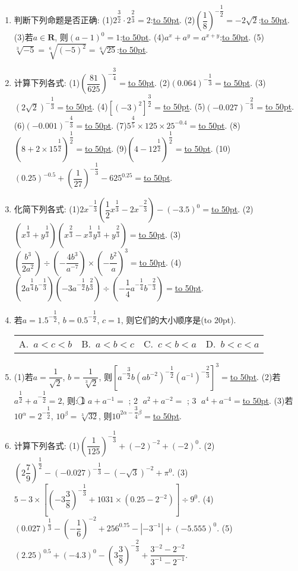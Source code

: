 \documentclass[10pt,a4paper]{article}
\newcommand{\blank}[1]{\underline{\hbox to #1pt{}}}
\newcommand{\bracket}[1]{(\hbox to #1pt{})}
\newcommand{\fourch}[4]{\par\begin{tabular}{p{.23\textwidth}p{.23\textwidth}p{.23\textwidth}p{.23\textwidth}}
A.~#1 &B.~#2& C.~#3& D.~#4
\end{tabular}}
\begin{document}
\begin{enumerate}[1.]
(3)$\sqrt [4]{x^2+y^2}=$\blank{50}.		(4)$\dfrac{\sqrt x}{\sqrt [3]{y^4}}=$\blank{50}.
(5)$\sqrt {2\sqrt 2}=$\blank{50}.			(6)$-\dfrac 1{\sqrt {27x}}=$\blank{50}.
(7)$\sqrt {\dfrac 4{3ab^3}}=$\blank{50}.			(8)$2\sqrt [6]{(m-n)^{-2}}=$    $(m<n)$.
\item 判断下列命题是否正确:
(1)$2^{\dfrac 32}\cdot 2^{\dfrac 23}=2$:\blank{50}.
(2)$(\dfrac 18)^{-\dfrac 12}=-2\sqrt 2$:\blank{50}.
(3)若$a\in \mathbf{R}$, 则$(a-1)^0=1$:\blank{50}.
(4)$a^x+a^y=a^{x+y}$:\blank{50}.
(5)$\sqrt [3]{-5}=\sqrt [6]{(-5)^2}=\sqrt [6]{25}$:\blank{50}.
\item 计算下列各式:
(1)$(\dfrac{81}{625})^{-\dfrac 34}=$\blank{50}.
(2)$(0.064)^{-\dfrac 13}=$\blank{50}.
(3)$(2\sqrt 2)^{-\dfrac 13}=$\blank{50}.
(4)$[ (-3)^2 ]^{\dfrac 32}=$\blank{50}.
(5)$(-0.027)^{-\dfrac 23}=$\blank{50}.
(6)$(-0.001)^{-\dfrac 43}=$\blank{50}.
(7)$5^{\dfrac 45}\times 125\times 25^{-0.4}=$\blank{50}.
(8)$(8+2\times 15^{\dfrac 12})^{\dfrac 12}=$\blank{50}.
(9)$(4-12^{\dfrac 12})^{\dfrac 12}=$\blank{50}.
(10)$(0.25)^{-0.5}+(\dfrac 1{27})^{-\dfrac 13}-625^{0.25}=$\blank{50}.
\item 化简下列各式:
(1)$2x^{-\dfrac 13}(\dfrac 12x^{\dfrac 13}-2x^{-\dfrac 23})-(-3.5)^0=$\blank{50}.
(2)$(x^{\dfrac 13}+y^{\dfrac 13})(x^{\dfrac 23}-x^{\dfrac 13}y^{\dfrac 13}+y^{\dfrac 23})=$\blank{50}.
(3)$(\dfrac{b^3}{2a^2})\div (-\dfrac{4b^3}{a^{-7}})\times (-\dfrac{b^2}a)^3=$\blank{50}.
(4)$(2a^{\dfrac 14}b^{-\dfrac 13})(-3a^{-\dfrac 12}b^{\dfrac 23})\div (-\dfrac 14a^{-\dfrac 14}b^{-\dfrac 23})=$\blank{50}.
\item 若$a=1.5^{-\dfrac 12}$, $b=0.5^{-\dfrac 12}$, $c=1$, 则它们的大小顺序是\bracket{20}.
\fourch{$a<c<b$}{$a<b<c$}{$c<b<a$}{$b<c<a$}
\item (1)若$a=\dfrac 1{\sqrt 2}$, $b=\dfrac 1{\sqrt[3]2}$, 则$[ a^{-\dfrac 32}b(ab^{-2})^{-\dfrac 12}(a^{-1})^{-\dfrac 23} ]^3=$\blank{50}.
(2)若$a^{\dfrac 12}+a^{-\dfrac 12}=2$, 则: \textcircled{1} $a+a^{-1}=$    ; \textcircled{2} $a^2+a^{-2}=$    ; \textcircled{3} $a^4+a^{-4}=$\blank{50}.
(3)若$10^{\alpha }=2^{-\dfrac 12}$, $10^{\beta }=\sqrt [3]{32}$, 则$10^{2\alpha -\dfrac 34\beta }=$\blank{50}.
\item 计算下列各式:
(1)$(\dfrac 1{125})^{-\dfrac 13}+(-2)^{-2}+(-2)^0$.
(2)$(2\dfrac 79)^{\dfrac 12}-(-0.027)^{-\dfrac 13}-(-\sqrt 3)^{-2}+\pi ^0$.
(3)$5-3\times [ (-3\dfrac 38)^{-\dfrac 13}+1031\times (0.25-2^{-2}) ]\div 9^0$.
(4)$(0.027)^{\dfrac 13}-(-\dfrac 16)^{-2}+256^{0.75}-|-3^{-1}|+(-5.555)^0$.
(5)$(2.25)^{0.5}+(-4.3)^0-(3\dfrac 38)^{-\dfrac 23}+\dfrac{3^{-2}-2^{-2}}{3^{-1}-2^{-1}}$.

\end{enumerate}
\end{document}
